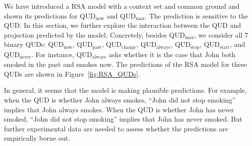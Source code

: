 We have introduced a RSA model with a context set and common ground and shown its
 predictions for QUD$_\textrm{now}$ and QUD$_\textrm{max}$.
The prediction is sensitive to the QUD. 
In this section, we further explore the interaction between the QUD and projection
 predicted by the model. 
Concretely, besides QUD$_\textrm{max}$, we consider all 7 binary QUDs: 
 QUD$_\text{now}$, QUD$_\text{past}$, QUD$_\text{change}$,
 QUD$_\text{always}$, QUD$_\text{stop}$, QUD$_\text{start}$, and QUD$_\text{never}$.
For instance, QUD$_\text{always}$ asks whether it is the case that John both smoked in
 the past and smokes now.
The predictions of the RSA model for these QUDs are shown in
 Figure~\ref{fig:RSA_QUDs}.
 
In general, it seems that the model is making plausible predictions. 
For example, when the QUD is whether John always smokes, ``John did not stop smoking'' implies that John always smokes. 
When the QUD is whether John has never smoked, ``John did not stop smoking'' implies that John has never smoked. 
But further experimental data are needed to assess whether the predictions are empirically borne out.

